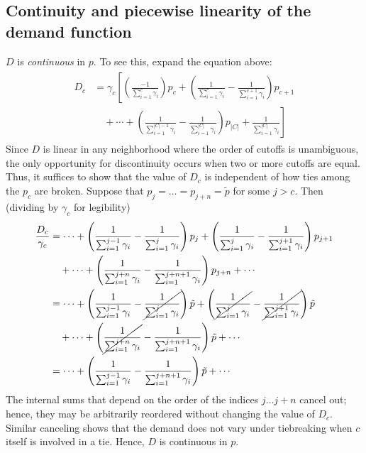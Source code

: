\documentclass[12pt]{article}
\numberwithin{equation}{subsection}
\theoremstyle{definition}
\begin{document}
\subsection{Continuity and piecewise linearity of the demand function} \label{continuityandpiecewiselinearity}
$D$ is \emph{continuous} in $p$. To see this, expand the equation above:
\begin{gather}
\begin{aligned}D_c &= \gamma_c \left[
\left( \frac{-1}{\sum_{i=1}^c \gamma_i}\right) p_c
+ \left(\frac{1}{\sum_{i=1}^{c} \gamma_i} - \frac{1}{\sum_{i=1}^{c+1} \gamma_i} \right) p_{c+1}
\right. \\ &\left.
\quad + \cdots
+ \left(\frac{1}{\sum_{i=1}^{|C|-1} \gamma_i} - \frac{1}{\sum_{i=1}^{|C|} \gamma_i}\right) p_{|C|}
+ \frac{1}{\sum_{i=1}^{|C|} \gamma_i}
\right]
\end{aligned}
\end{gather}
Since $D$ is linear in any neighborhood where the order of cutoffs is unambiguous, the only opportunity for discontinuity occurs when two or more cutoffs are equal. Thus, it suffices to show that the value of $D_c$ is independent of how ties among the $p_c$ are broken. Suppose that $p_j = \dots = p_{j+n} = \tilde p$ for some $j > c$. Then (dividing by $\gamma_c$ for legibility)
\begin{gather}
\begin{aligned}
\frac{D_c}{\gamma_c} &= \cdots
+ \left(\frac{1}{\sum_{i=1}^{j-1} \gamma_i} - \frac{1}{\sum_{i=1}^{j} \gamma_i} \right) p_{j}
+ \left(\frac{1}{\sum_{i=1}^{j} \gamma_i} - \frac{1}{\sum_{i=1}^{j+1} \gamma_i} \right) p_{j+1}
 \\ &\quad + \cdots
+ \left(\frac{1}{\sum_{i=1}^{j+n} \gamma_i} - \frac{1}{\sum_{i=1}^{j+n+1} \gamma_i}\right) p_{j+n}
+ \cdots \\
&= \cdots
+ \left(\frac{1}{\sum_{i=1}^{j-1} \gamma_i} - \cancel{\frac{1}{\sum_{i=1}^{j} \gamma_i}} \right) \tilde p
+ \left(\cancel{\frac{1}{\sum_{i=1}^{j} \gamma_i}} - \cancel{\frac{1}{\sum_{i=1}^{j+1} \gamma_i}} \right) \tilde p
\\ &\quad  + \cdots
+ \left(\cancel{\frac{1}{\sum_{i=1}^{j+n} \gamma_i}} - \frac{1}{\sum_{i=1}^{j+n+1} \gamma_i}\right) \tilde p
+ \cdots \\
&= \cdots
+ \left(\frac{1}{\sum_{i=1}^{j-1} \gamma_i} - \frac{1}{\sum_{i=1}^{j+n+1} \gamma_i}\right) \tilde p
+ \cdots
\end{aligned}
\end{gather}
The internal sums that depend on the order of the indices $j \dots j+n$ cancel out; hence, they may be arbitrarily reordered without changing the value of $D_c$. Similar canceling shows that the demand does not vary under tiebreaking when $c$ itself is involved in a tie. Hence, $D$ is continuous in $p$. 
\end{document}
